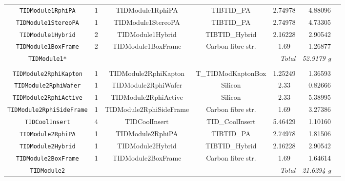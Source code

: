 \documentclass{cmspaper}
\begin{document}
\begin{sidewaystable}[p]
\begin{center}
\begin{tabular}{cccccrr}
	 {\tt TIDModule1RphiPA}             & 1     & TIDModule1RphiPA              & TIBTID\_PA            & 2.74978       & 4.88096  &  \\
	 {\tt TIDModule1StereoPA}           & 1     & TIDModule1StereoPA            & TIBTID\_PA            & 2.74978       & 4.73305  &  \\
	 {\tt TIDModule1Hybrid}             & 2     & TIDModule1Hybrid              & TIBTID\_Hybrid        & 2.16228       & 2.90542  &  \\
	 {\tt TIDModule1BoxFrame}           & 2     & TIDModule1BoxFrame            & Carbon fibre str.     & 1.69          & 1.26877  &  \\
	 {\tt TIDModule1*}             & \multicolumn{4}{r}{\em Total } & {\em 52.9179 g } & \\
	 \hline	 \\
	 {\tt TIDModule2RphiKapton}     & 1     & TIDModule2RphiKapton          & T\_TIDModKaptonBox    & 1.25249       & 1.36593  &   \\
	 {\tt TIDModule2RphiWafer}      & 1     & TIDModule2RphiWafer           & Silicon               & 2.33          & 0.82666  &   \\
	 {\tt TIDModule2RphiActive}     & 1     & TIDModule2RphiActive          & Silicon               & 2.33          & 5.38995  &   \\
	 {\tt TIDModule2RphiSideFrame}  & 1     & TIDModule2RphiSideFrame       & Carbon fibre str.     & 1.69          & 3.27386  &   \\
	 {\tt TIDCoolInsert}            & 4     & TIDCoolInsert                 & TID\_CoolInsert       & 5.46429       & 1.10160  &   \\
	 {\tt TIDModule2RphiPA}         & 1     & TIDModule2RphiPA              & TIBTID\_PA            & 2.74978       & 1.81506  &   \\
	 {\tt TIDModule2Hybrid}         & 1     & TIDModule2Hybrid              & TIBTID\_Hybrid        & 2.16228       & 2.90542  &   \\
	 {\tt TIDModule2BoxFrame}       & 1     & TIDModule2BoxFrame            & Carbon fibre str.     & 1.69          & 1.64614  &   \\
	 {\tt TIDModule2}          & \multicolumn{4}{r}{\em Total } & {\em 21.6294 g} & \\
	 \hline
    \end{tabular}
  \end{center}
\end{sidewaystable}
%
\pagebreak
\end{document}

